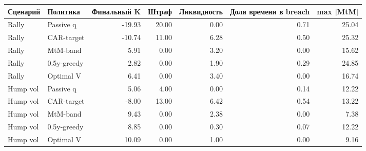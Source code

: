 \begin{tabular}{llrrrrr}
\toprule
Сценарий & Политика & Финальный K & Штраф & Ликвидность & Доля времени в breach & max |MtM| \\
\midrule
Rally & Passive q & -19.93 & 20.00 & 0.00 & 0.71 & 25.04 \\
Rally & CAR-target & -10.74 & 11.00 & 6.28 & 0.50 & 25.32 \\
Rally & MtM-band & 5.91 & 0.00 & 3.20 & 0.00 & 15.62 \\
Rally & 0.5y-greedy & 2.82 & 0.00 & 1.90 & 0.29 & 24.85 \\
Rally & Optimal V & 6.41 & 0.00 & 3.40 & 0.00 & 16.74 \\
Hump vol & Passive q & 5.06 & 4.00 & 0.00 & 0.14 & 12.22 \\
Hump vol & CAR-target & -8.00 & 13.00 & 6.42 & 0.54 & 13.22 \\
Hump vol & MtM-band & 9.43 & 0.00 & 2.38 & 0.00 & 7.38 \\
Hump vol & 0.5y-greedy & 8.85 & 0.00 & 0.30 & 0.07 & 12.22 \\
Hump vol & Optimal V & 10.09 & 0.00 & 1.00 & 0.00 & 9.16 \\
\bottomrule
\end{tabular}
